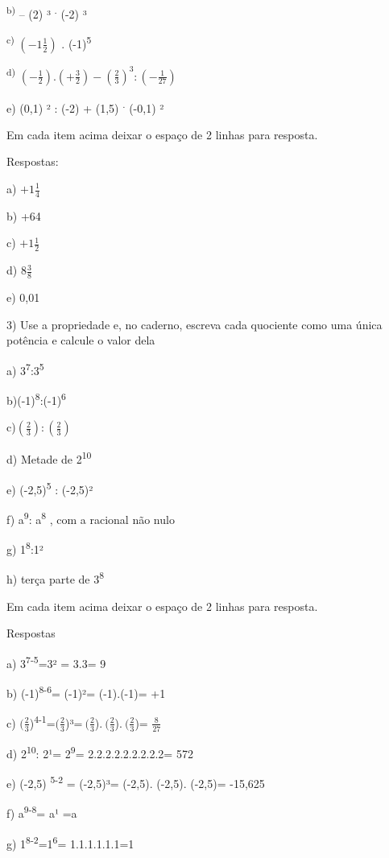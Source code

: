 {\textsuperscript{b)} -- (2) ³ \textsuperscript{.} (-2) ³

\textsuperscript{c)} \(( - 1\frac{1}{2})\) . (-1)\textsuperscript{5}

\textsuperscript{d)}
\(\left( - \frac{1}{2} \right).\left( + \frac{3}{2} \right) - \left( \frac{2}{3} \right)^{3}:( - \frac{1}{27})\ \)

e) (0,1) ² : (-2) + (1,5) \textsuperscript{.} (-0,1) ²

Em cada item acima deixar o espaço de 2 linhas para resposta.

Respostas:

a) \(+ 1\frac{1}{4}\)

b) +64

c) \(+ 1\frac{1}{2}\)

d) 8\(\frac{3}{8}\)

e) 0,01

3) Use a propriedade e, no caderno, escreva cada quociente como uma
única potência e calcule o valor dela

a) 3\textsuperscript{7}:3\textsuperscript{5}

b)(-1)\textsuperscript{8}:(-1)\textsuperscript{6}

c)\(\left( \frac{2}{3} \right):\left( \frac{2}{3} \right)\)

d) Metade de 2\textsuperscript{10}

e) (-2,5)\textsuperscript{5} : (-2,5)²

f) a\textsuperscript{9}: a\textsuperscript{8} , com a racional não nulo

g) 1\textsuperscript{8}:1²

h) terça parte de 3\textsuperscript{8}

Em cada item acima deixar o espaço de 2 linhas para resposta.

Respostas

a) 3\textsuperscript{7-5}=3² = 3.3= 9

b) (-1)\textsuperscript{8-6}= (-1)²= (-1).(-1)= +1

c)
\((\frac{2}{3}\))\textsuperscript{4-1}=\((\frac{2}{3}\))³=\(\ (\frac{2}{3}\)).\(\ (\frac{2}{3}\)).\(\ (\frac{2}{3}\))=
\(\frac{8}{27}\)

d) 2\textsuperscript{10}: 2¹= 2\textsuperscript{9}= 2.2.2.2.2.2.2.2.2=
572

e) (-2,5) \textsuperscript{5-2} = (-2,5)³= (-2,5). (-2,5). (-2,5)=
-15,625

f) a\textsuperscript{9-8}= a¹ =a

g) 1\textsuperscript{8-2}=1\textsuperscript{6}= 1.1.1.1.1.1=1

}
